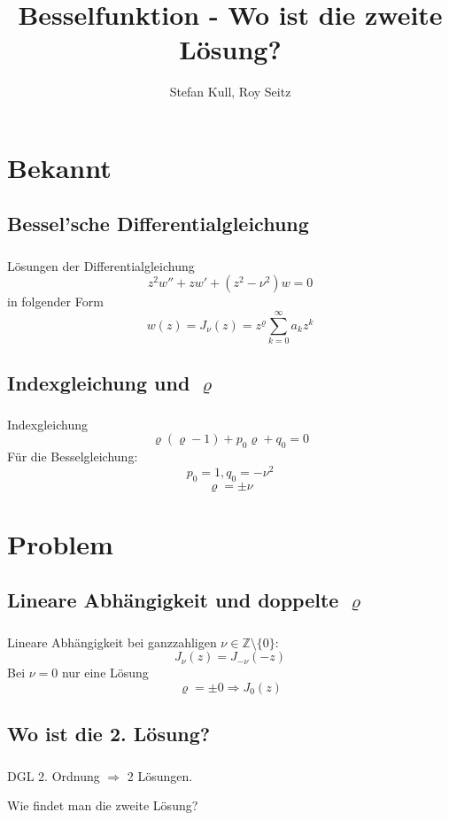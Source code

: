 \documentclass{beamer}
\author{Stefan Kull, Roy Seitz}
\title{Besselfunktion - Wo ist die zweite Lösung?}
\newenvironment{slide}
{\begin{frame}[environment=slide]
	\frametitle{\insertsection}
	\framesubtitle{\insertsubsection}}
{\end{frame}}
\begin{document}
	
	\begin{slide}
		\titlepage
	\end{slide}
	
	\begin{slide}
		\tableofcontents
	\end{slide}
	
\section{Bekannt}	
\subsection{Bessel'sche Differentialgleichung}	
	\begin{slide}
		Lösungen der Differentialgleichung
		$$ z^2w''+zw'+(z^2-\nu^2)w=0 $$
		in folgender Form
		$$
		w(z)=J_\nu(z)=z^\varrho\sum_{k=0}^{\infty}a_kz^k 
		$$
	\end{slide}
	
\subsection{Indexgleichung und $\varrho$}
	\begin{slide}
		Indexgleichung
		$$\varrho(\varrho-1)+p_0\varrho+q_0=0$$
		Für die Besselgleichung:
		$$p_0=1, q_0=-\nu^2$$
		$$\varrho=\pm\nu $$
	\end{slide}

\section{Problem}
\subsection{Lineare Abhängigkeit und doppelte $\varrho$}
	\begin{slide}
		Lineare Abhängigkeit bei ganzzahligen $\nu\in\mathbb{Z}\setminus\{0\}$:
		$$J_\nu(z) = J_{-\nu}(-z)$$
		Bei $\nu=0$ nur eine Lösung
		$$\varrho=\pm 0\Rightarrow J_0(z)$$
	\end{slide}
	
\subsection{Wo ist die 2. Lösung?}
	\begin{slide}		
		DGL 2. Ordnung $\Rightarrow$ 2 Lösungen.
		
		Wie findet man die zweite Lösung?
		
	\end{slide}
	
\end{document}
